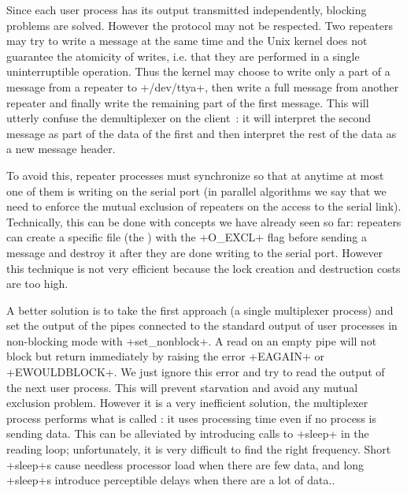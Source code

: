 Since each user process has its output transmitted independently,
blocking problems are solved. However the protocol may not be
respected. Two repeaters may try to write a message at the same time
and the Unix kernel does not guarantee the atomicity of writes,
i.e. that they are performed in a single uninterruptible operation.
Thus the kernel may choose to write only a part of a message from a
repeater to \ml+/dev/ttya+, then write a full message from another
repeater and finally write the remaining part of the first message.
This will utterly confuse the demultiplexer on the client~: 
it will interpret the second message as part of the data of the
first and then interpret the rest of the data as a new message header.

To avoid this, repeater processes must synchronize so that at anytime
at most one of them is writing on the serial port (in parallel
algorithms we say that we need to enforce the mutual exclusion of
repeaters on the access to the serial link). Technically, this can be
done with concepts we have already seen so far: repeaters can create a
specific file (the ) with the \ml+O_EXCL+ flag before
sending a message and destroy it after they are done writing to the
serial port. However this technique is not very efficient because the
lock creation and destruction costs are too high.

A better solution is to take the first approach (a single
multiplexer process) and set the output of the pipes connected to the
standard output of user processes in non-blocking mode with
\ml+set_nonblock+. A read on an empty pipe will not block but return
immediately by raising the error \ml+EAGAIN+ or \ml+EWOULDBLOCK+. We
just ignore this error and try to read the output of the next user
process. This will prevent starvation and avoid any mutual exclusion
problem. However it is a very inefficient solution, the multiplexer
process performs what is called : it uses
processing time even if no process is
sending data. This can be alleviated by introducing calls to
\ml+sleep+ in the reading loop; unfortunately, it is very difficult to find
the right frequency. Short \ml+sleep+s cause needless processor load when there
are few data, and long \ml+sleep+s introduce perceptible delays when there are a lot of data..

